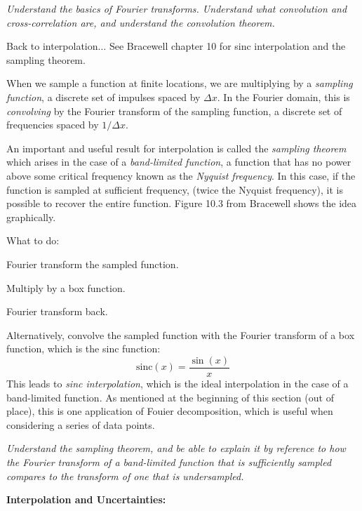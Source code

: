 \documentclass{article}
\newcommand{\test}[1]{%
    \begin{center}
        \colorbox{hl}{\parbox{0.9\textwidth}{\emph{#1}}}
    \end{center}}
\begin{document}
\test{Understand the basics of Fourier transforms. Understand what
convolution and cross-correlation are, and understand the convolution
theorem.}

Back to interpolation$\ldots$ See Bracewell chapter 10 for sinc
interpolation and the sampling theorem.

When we sample a function at finite locations, we are multiplying by a
\emph{sampling function}, a discrete set of impulses spaced by
$\Delta{x}$. In the Fourier domain, this is \emph{convolving} by the Fourier
transform of the sampling function, a discrete set of frequencies
spaced by $1/\Delta{x}$.

An important and useful result for interpolation is called the
\emph{sampling theorem} which arises in the case of a \emph{band-limited
function}, a function that has no power above some critical frequency
known as the \emph{Nyquist frequency}. In this case, if the function is
sampled at sufficient frequency, (twice the Nyquist frequency), it is
possible to recover the entire function. Figure 10.3 from Bracewell shows
the idea graphically.

What to do:
\begin{enumerate*}
    \item Fourier transform the sampled function.
    \item Multiply by a box function.
    \item Fourier transform back.
\end{enumerate*}
Alternatively, convolve
the sampled function with the Fourier transform of a box function,
which is the sinc function:
$$ \textrm{sinc}(x) = \frac{\sin(x)}{x} $$
This leads to \emph{sinc interpolation}, which is the ideal interpolation
in the case of a band-limited function. As mentioned at the beginning of
this section (out of place), this is one application of Fouier
decomposition, which is useful when considering a series of data points.

\test{Understand the sampling theorem, and be able to explain it by
reference to how the Fourier transform of a band-limited function that is
sufficiently sampled compares to the transform of one that is undersampled.}

{\bf Interpolation and Uncertainties:}
\end{document}
